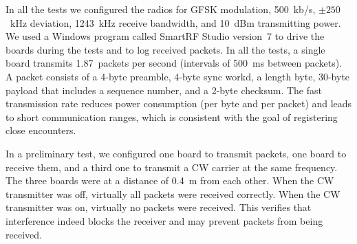 In all the tests we configured the radios for GFSK modulation, 500~kb/s, $\pm 250$~kHz deviation, 1243~kHz receive bandwidth,
and 10~dBm transmitting power. We used a Windows program called SmartRF Studio version~7 to drive the boards during
the tests and to log received packets. In all the tests,
a single board transmits 1.87~packets per second (intervals of
500~ms between packets). A packet consists of a 4-byte preamble, 4-byte sync workd, a length byte, 30-byte payload 
that includes a sequence number, and a 2-byte checksum. The fast transmission rate reduces power consumption (per byte and
per packet) and leads to short communication ranges, which is consistent with the goal of registering close encounters.

In a preliminary test, we configured one board to transmit packets, one
board to receive them, and a third one to transmit a
CW carrier at the same frequency. The three boards were at a distance of 0.4~m from each other. When the CW transmitter
was off, virtually all packets were received correctly. When the CW transmitter was on, virtually no packets were received.
This verifies that interference indeed blocks the receiver and may prevent packets from being received.



